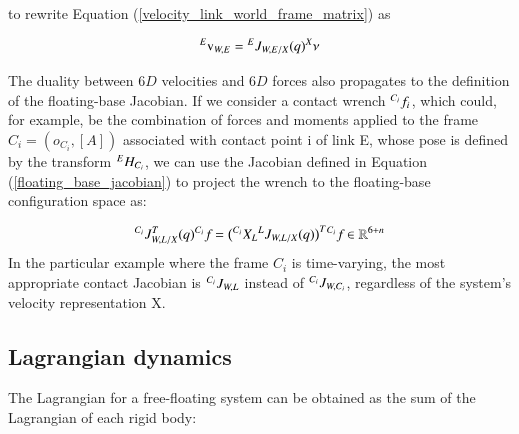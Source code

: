 to rewrite Equation (\ref{velocity_link_world_frame_matrix}) as 

\begin{equation}
    {}^{E}{\text{v}}_{W,E} = {}^{E}{J}_{W,E/X}(q) {}^{X}{\nu}_{}
\end{equation}

The duality between $6D$ velocities and $6D$ forces also propagates to the definition of the floating-base Jacobian. If we consider a
contact wrench ${}^{C_i}{f_i}_{}$, which could, for example, be the combination of forces and moments
applied to the frame $C_i = (o_{C_i}, [A])$ associated with contact point i of link E, whose pose
is defined by the transform ${}^{E}{H}_{C_i}$, we can use the Jacobian defined in Equation (\ref{floating_base_jacobian}) to
project the wrench to the floating-base configuration space as:

\begin{equation}\label{eq:contact_wrench_projection}
    {}^{C_i}{J}_{W,L/X}^T(q) {}^{C_i}{f}_{} = \big( {}^{C_i}{X}_{L}{}^{L}{J}_{W,L/X}(q) \big)^T {}^{C_i}{f}_{} \in \mathbb{R}^{6+n}
\end{equation}
In the particular example where the frame $C_i$ is time-varying, the most appropriate contact Jacobian is ${}^{C_i}{J}_{W,L}$ 
instead of ${}^{C_i}{J}_{W,C_i}$, regardless of the system’s velocity representation X.

\subsection{Lagrangian dynamics}

The Lagrangian for a free-floating system can be obtained as the sum of the Lagrangian of each rigid body:


